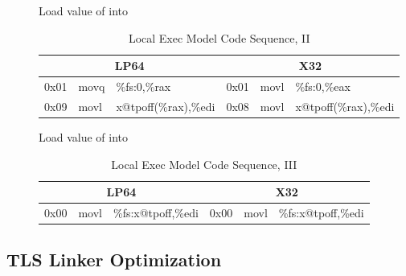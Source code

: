 \begin{description}
\item[]
  Load value of  into 

\begin{table}[H]
\Hrule
\caption{Local Exec Model Code Sequence, II}
\begin{center}
\code\small{
\begin{tabular}{lll|lll}
\multicolumn{3}{c}{LP64} & \multicolumn{3}{c}{X32} \\
\hline
0x01 & movq & \%fs:0,\%rax		& 0x01 & movl & \%fs:0,\%eax \\
0x09 & movl & x@tpoff(\%rax),\%edi	& 0x08 & movl & x@tpoff(\%rax),\%edi \\
\end{tabular}
}
\end{center}
\Hrule
\end{table}

\item[]
  Load value of  into 

\begin{table}[H]
\Hrule
\caption{Local Exec Model Code Sequence, III}
\begin{center}
\code\small{
\begin{tabular}{lll|lll}
\multicolumn{3}{c}{LP64} & \multicolumn{3}{c}{X32} \\
\hline
0x00 & movl & \%fs:x@tpoff,\%edi	& 0x00 & movl & \%fs:x@tpoff,\%edi \\
\end{tabular}
}
\end{center}
\Hrule
\end{table}

\end{description}

\subsection{TLS Linker Optimization}

